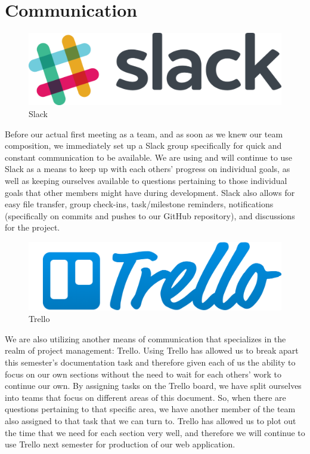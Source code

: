 \documentclass[12pt,a4paper]{report}
\begin{document}
	\section{Communication}
	\begin{figure}
		\includegraphics[scale=.15]{slack}
		\caption{Slack}
		\label{fig: Slack}
	\end{figure}
	Before our actual first meeting as a team, and as soon as we knew our team composition, we immediately set up a Slack group specifically for quick and constant communication to be available. We are using and will continue to use Slack as a means to keep up with each others' progress on individual goals, as well as keeping ourselves available to questions pertaining to those individual goals that other members might have during development. Slack also allows for easy file transfer, group check-ins, task/milestone reminders, notifications (specifically on commits and pushes to our GitHub repository), and discussions for the project. \par
	\begin{figure}
		\includegraphics[scale=.06]{trello}
		\caption{Trello}
		\label{fig: Trello}
	\end{figure}
	We are also utilizing another means of communication that specializes in the realm of project management: Trello. Using Trello has allowed us to break apart this semester's documentation task and therefore given each of us the ability to focus on our own sections without the need to wait for each others' work to continue our own. By assigning tasks on the Trello board, we have split ourselves into teams that focus on different areas of this document. So, when there are questions pertaining to that specific area, we have another member of the team also assigned to that task that we can turn to. Trello has allowed us to plot out the time that we need for each section very well, and therefore we will continue to use Trello next semester for production of our web application.
\end{document}
